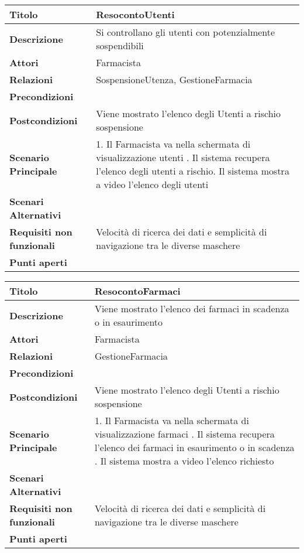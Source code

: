 \begin{tabular} {|P{4.5cm}|P{12.5cm}|}
\hline
  \textbf{Titolo} & ResocontoUtenti\\
\hline
  \textbf{Descrizione} & Si controllano gli utenti con potenzialmente sospendibili\\
\hline
  \textbf{Attori} & Farmacista\\
\hline
  \textbf{Relazioni} & SospensioneUtenza, GestioneFarmacia\\
\hline
  \textbf{Precondizioni} &\\
\hline
  \textbf{Postcondizioni} & Viene mostrato l'elenco degli Utenti a rischio sospensione\\
\hline
  \textbf{Scenario Principale} & 1. Il Farmacista va nella schermata di visualizzazione utenti . Il sistema recupera l'elenco degli utenti a rischio. Il sistema mostra a video l'elenco degli utenti\\
\hline
  \textbf{Scenari Alternativi} &\\
\hline
  \textbf{Requisiti non funzionali} & Velocità di ricerca dei dati e semplicità di navigazione tra le diverse maschere\\
\hline
  \textbf{Punti aperti} & \\
\hline
\end{tabular}
\hfill
\break

\begin{tabular} {|P{4.5cm}|P{12.5cm}|}
\hline
  \textbf{Titolo} & ResocontoFarmaci\\
\hline
  \textbf{Descrizione} & Viene mostrato l'elenco dei farmaci in scadenza o in esaurimento\\
\hline
  \textbf{Attori} & Farmacista\\
\hline
  \textbf{Relazioni} & GestioneFarmacia\\
\hline
  \textbf{Precondizioni} &\\
\hline
  \textbf{Postcondizioni} & Viene mostrato l'elenco degli Utenti a rischio sospensione\\
\hline
  \textbf{Scenario Principale} & 1. Il Farmacista va nella schermata di visualizzazione farmaci . Il sistema recupera l'elenco dei farmaci in esaurimento o in scadenza . Il sistema mostra a video l'elenco richiesto\\
\hline
  \textbf{Scenari Alternativi} &\\
\hline
  \textbf{Requisiti non funzionali} & Velocità di ricerca dei dati e semplicità di navigazione tra le diverse maschere\\
\hline
  \textbf{Punti aperti} &\\
\hline
\end{tabular}
\hfill
\break


